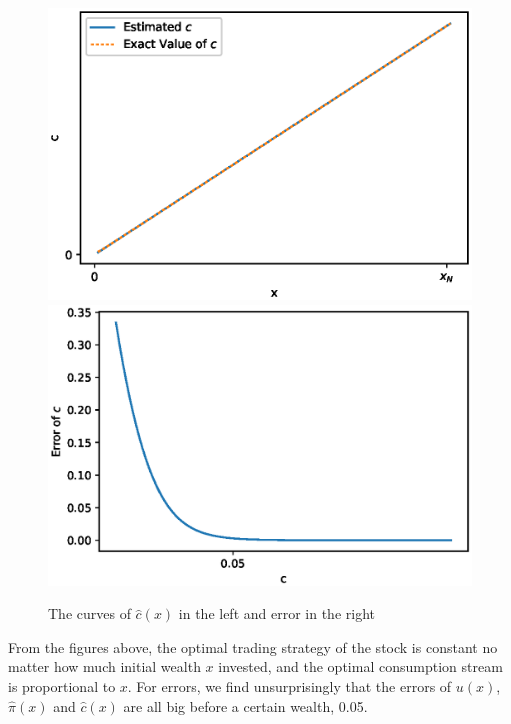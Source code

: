 \documentclass[a4paper]{article}
\theoremstyle{definition}
\numberwithin{equation}{section}
\begin{document}
\begin{figure}[H]
\centering
\includegraphics[scale=0.45]{Mertonc.eps}
\includegraphics[scale=0.45]{Mertoncerror.eps}
\caption{The curves of $\hat c(x)$ in the left and error in the right}
\label{fig:MertonC}
\end{figure}

From the figures above, the optimal trading strategy of the stock is constant no matter how much initial wealth $x$ invested, and the optimal consumption stream is proportional to $x$. For errors, we find unsurprisingly that the errors of $u(x)$, $\hat\pi(x)$ and $\hat c(x)$ are all big before a certain wealth, 0.05.
\end{document}
